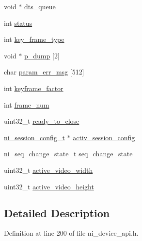\begin{DoxyCompactItemize}
\item 
void $\ast$ \mbox{\hyperlink{struct__ni__session__context_a4d72ef2de1e0134204bc716d47e94080}{dts\+\_\+queue}}
\item 
int \mbox{\hyperlink{struct__ni__session__context_a6e27f49150e9a14580fb313cc2777e00}{status}}
\item 
int \mbox{\hyperlink{struct__ni__session__context_ae2603216ff320a51d17789cc8183f6b0}{key\+\_\+frame\+\_\+type}}
\item 
void $\ast$ \mbox{\hyperlink{struct__ni__session__context_aaaf3f4ab34f8bc046c56fb3e915b7581}{p\+\_\+dump}} \mbox{[}2\mbox{]}
\item 
char \mbox{\hyperlink{struct__ni__session__context_a27b70a4bd5e29c151436424c29b5b016}{param\+\_\+err\+\_\+msg}} \mbox{[}512\mbox{]}
\item 
int \mbox{\hyperlink{struct__ni__session__context_acb2f4c740e7dfbe1f89618131ada24ff}{keyframe\+\_\+factor}}
\item 
int \mbox{\hyperlink{struct__ni__session__context_aa0e8135e1ff3d1dc3e9909ef61d39e00}{frame\+\_\+num}}
\item 
uint32\+\_\+t \mbox{\hyperlink{struct__ni__session__context_a5b2b5d5bc3b8d8a808a941ac238be6c8}{ready\+\_\+to\+\_\+close}}
\item 
\mbox{\hyperlink{ni__device__api_8h_a339e8b5178897f31af91ea5543d8d23a}{ni\+\_\+session\+\_\+config\+\_\+t}} $\ast$ \mbox{\hyperlink{struct__ni__session__context_a7c5d054f53b7b7ecd27b38705139e847}{activ\+\_\+session\+\_\+config}}
\item 
\mbox{\hyperlink{ni__device__api_8h_a139b7f0724b1c7ef7135df09e70eb814}{ni\+\_\+seq\+\_\+change\+\_\+state\+\_\+t}} \mbox{\hyperlink{struct__ni__session__context_a64ed8372b7bdc10e85c161c9e1c43d8e}{seq\+\_\+change\+\_\+state}}
\item 
uint32\+\_\+t \mbox{\hyperlink{struct__ni__session__context_ae50c7a634ab2eb49088193b2dc18e70e}{active\+\_\+video\+\_\+width}}
\item 
uint32\+\_\+t \mbox{\hyperlink{struct__ni__session__context_ae71fa3483543c59c91f3db39f7016092}{active\+\_\+video\+\_\+height}}
\end{DoxyCompactItemize}


\subsection{Detailed Description}


Definition at line 200 of file ni\+\_\+device\+\_\+api.\+h.



